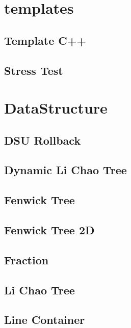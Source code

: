 \section{templates}
\subsection{Template C++}
\raggedbottom
\hrulefill
\subsection{Stress Test}
\raggedbottom
\hrulefill
\newpage

\section{DataStructure}
\subsection{DSU Rollback}
\raggedbottom
\hrulefill
\subsection{Dynamic Li Chao Tree}
\raggedbottom
\hrulefill
\subsection{Fenwick Tree}
\raggedbottom
\hrulefill
\subsection{Fenwick Tree 2D}
\raggedbottom
\hrulefill
\subsection{Fraction}
\raggedbottom
\hrulefill
\subsection{Li Chao Tree}
\raggedbottom
\hrulefill
\subsection{Line Container}
\raggedbottom
\hrulefill

